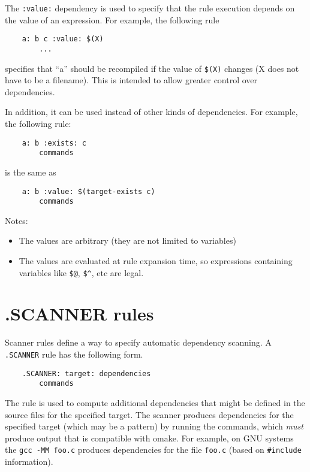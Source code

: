 The \verb+:value:+ dependency is used to specify that the rule execution depends on the value of an
expression.  For example, the following rule

\begin{verbatim}
    a: b c :value: $(X)
        ...
\end{verbatim}

specifies that ``a'' should be recompiled if the value of \verb+$(X)+ changes
(X does not have to be a filename).  This is intended to allow greater
control over dependencies.

In addition, it can be used instead of other kinds of dependencies. For example,
the following rule:

\begin{verbatim}
    a: b :exists: c
        commands
\end{verbatim}

is the same as

\begin{verbatim}
    a: b :value: $(target-exists c)
        commands
\end{verbatim}

Notes:
\begin{itemize}
\item The values are arbitrary (they are not limited to variables)
\item The values are evaluated at rule expansion time, so expressions
containing variables like \verb+$@+, \verb+$^+, etc are legal.
\end{itemize}

\section{.SCANNER rules}

Scanner rules define a way to specify automatic dependency scanning.  A \verb+.SCANNER+ rule has the
following form.

\begin{verbatim}
    .SCANNER: target: dependencies
        commands
\end{verbatim}

The rule is used to compute additional dependencies that might be defined in the source files for
the specified target.  The scanner produces dependencies for the specified target (which may be a
pattern) by running the commands, which \emph{must} produce output that is compatible with omake.
For example, on GNU systems the \verb+gcc -MM foo.c+ produces dependencies for the file \verb+foo.c+
(based on \verb+#include+ information).

